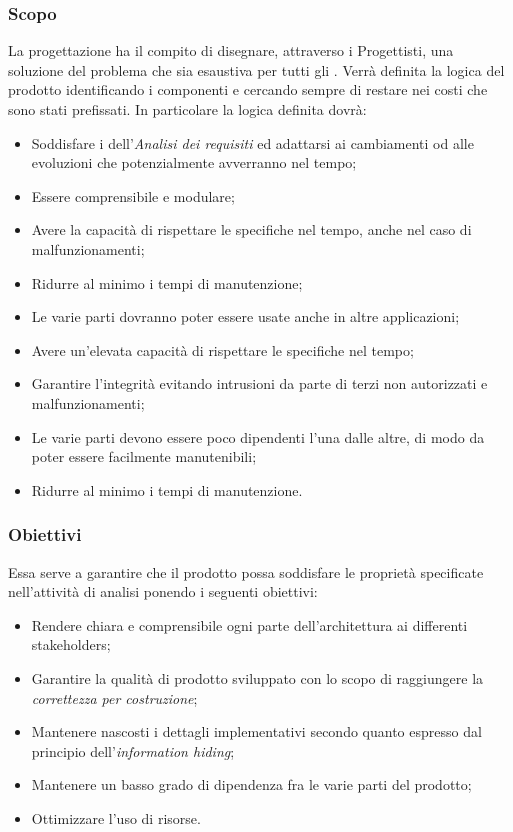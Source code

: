 \subsubsection{Scopo}
La progettazione ha il compito di disegnare, attraverso i Progettisti, una soluzione del problema che sia esaustiva per tutti gli . Verrà definita la logica del prodotto identificando i componenti e cercando sempre di restare nei costi che sono stati prefissati. In particolare la logica definita dovrà:
\begin{itemize}
	\item Soddisfare i  dell’\emph{Analisi dei requisiti} ed adattarsi ai cambiamenti od alle evoluzioni che potenzialmente avverranno nel tempo;
	\item Essere comprensibile e modulare;
	\item Avere la capacità di rispettare le specifiche nel tempo, anche nel caso di malfunzionamenti;
	\item Ridurre al minimo i tempi di manutenzione;
	\item Le varie parti dovranno poter essere usate anche in altre applicazioni;
	\item Avere un'elevata capacità di rispettare le specifiche nel tempo;
	\item Garantire l'integrità evitando intrusioni da parte di terzi non autorizzati e malfunzionamenti;
	\item Le varie parti devono essere poco dipendenti l'una dalle altre, di modo da poter essere facilmente manutenibili;
	\item Ridurre al minimo i tempi di manutenzione.
\end{itemize}
\subsubsection{Obiettivi}
Essa serve a garantire che il prodotto possa soddisfare le proprietà specificate nell'attività di analisi ponendo i seguenti obiettivi:
\begin{itemize}
    \item Rendere chiara e comprensibile ogni parte dell'architettura ai differenti stakeholders;
    \item Garantire la qualità di prodotto sviluppato con lo scopo di raggiungere la \textit{correttezza per costruzione};
    \item Mantenere nascosti i dettagli implementativi secondo quanto espresso dal principio dell'\textit{information hiding};
    \item Mantenere un basso grado di dipendenza fra le varie parti del prodotto;
    \item Ottimizzare l'uso di risorse.
\end{itemize}
